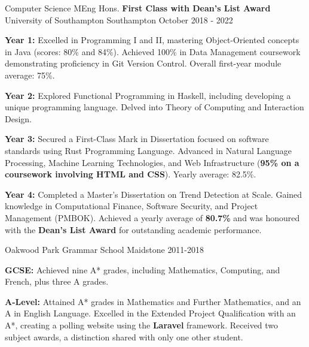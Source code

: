 \begin{cventries}
  \cventry
    {Computer Science MEng Hons. \textbf{First Class with Dean's List Award}} %
    {University of Southampton} %
    {Southampton} %
    {October 2018 - 2022 } %
    {
      \begin{cvitems} %
        \item {\textbf{Year 1:} Excelled in Programming I and II, mastering Object-Oriented concepts in Java (scores: 80\% and 84\%). Achieved 100\% in Data Management coursework demonstrating proficiency in Git Version Control. Overall first-year module average: 75\%.}
        \vspace{0.5mm}
        \item {\textbf{Year 2:} Explored Functional Programming in Haskell, including developing a unique programming language. Delved into Theory of Computing and Interaction Design.}
        \item {\textbf{Year 3:} Secured a First-Class Mark in Dissertation focused on software standards using Rust Programming Language. Advanced in Natural Language Processing, Machine Learning Technologies, and Web Infrastructure (\textbf{95\% on a coursework involving HTML and CSS}). Yearly average: 82.5\%.}
        \item {\textbf{Year 4:} Completed a Master's Dissertation on Trend Detection at Scale. Gained knowledge in Computational Finance, Software Security, and Project Management (PMBOK). Achieved a yearly average of \textbf{80.7\%} and was honoured with the \textbf{Dean's List Award} for outstanding academic performance.}
      \end{cvitems}
    }
  \cventry
    {}
    {Oakwood Park Grammar School}
    {Maidstone}
    {2011-2018}
    {
      \begin{cvitems} %
        \item {\textbf{GCSE:} Achieved nine A* grades, including Mathematics, Computing, and French, plus three A grades.}
        \vspace{0.5mm}
        \item {\textbf{A-Level:} Attained A* grades in Mathematics and Further Mathematics, and an A in English Language. Excelled in the Extended Project Qualification with an A*, creating a polling website using the \textbf{Laravel} framework. Received two subject awards, a distinction shared with only one other student.}
      \end{cvitems}
    }
    \\[10pt]
\end{cventries}


